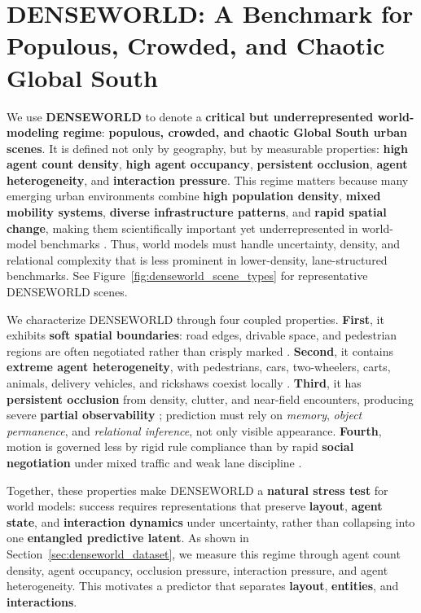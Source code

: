 





\section{\textbf{DENSEWORLD}: A Benchmark for \textbf{Populous, Crowded, and Chaotic} Global South}

We use \textbf{DENSEWORLD} to denote a \textbf{critical but underrepresented world-modeling regime}: \textbf{populous, crowded, and chaotic Global South urban scenes}. It is defined not only by geography, but by measurable properties: \textbf{high agent count density}, \textbf{high agent occupancy}, \textbf{persistent occlusion}, \textbf{agent heterogeneity}, and \textbf{interaction pressure}. This regime matters because many emerging urban environments combine \textbf{high population density}, \textbf{mixed mobility systems}, \textbf{diverse infrastructure patterns}, and \textbf{rapid spatial change}, making them scientifically important yet underrepresented in world-model benchmarks \cite{mahendra2021seven,ellis2016leveraging}. Thus, world models must handle uncertainty, density, and relational complexity that is less prominent in lower-density, lane-structured benchmarks. See Figure~\ref{fig:denseworld_scene_types} for representative DENSEWORLD scenes.



We characterize DENSEWORLD through four coupled properties. \textbf{First}, it exhibits \textbf{soft spatial boundaries}: road edges, drivable space, and pedestrian regions are often negotiated rather than crisply marked \cite{varma2019idd, dokania2023idd3d}. \textbf{Second}, it contains \textbf{extreme agent heterogeneity}, with pedestrians, cars, two-wheelers, carts, animals, delivery vehicles, and rickshaws coexist locally \cite{khan1999heterogeneous,asaithambi2012mixedtraffic}. \textbf{Third}, it has \textbf{persistent occlusion} from density, clutter, and near-field encounters, producing severe \textbf{partial observability} \cite{varma2019idd, dokania2023idd3d}; prediction must rely on \emph{memory}, \emph{object permanence}, and \emph{relational inference}, not only visible appearance. \textbf{Fourth}, motion is governed less by rigid rule compliance than by rapid \textbf{social negotiation} under mixed traffic and weak lane discipline \cite{papathanasopoulou2018weaklane,asaithambi2012mixedtraffic}.

Together, these properties make DENSEWORLD a \textbf{natural stress test} for world models: success requires representations that preserve \textbf{layout}, \textbf{agent state}, and \textbf{interaction dynamics} under uncertainty, rather than collapsing into one \textbf{entangled predictive latent}. As shown in Section~\ref{sec:denseworld_dataset}, we measure this regime through agent count density, agent occupancy, occlusion pressure, interaction pressure, and agent heterogeneity. This motivates a predictor that separates \textbf{layout}, \textbf{entities}, and \textbf{interactions}.


